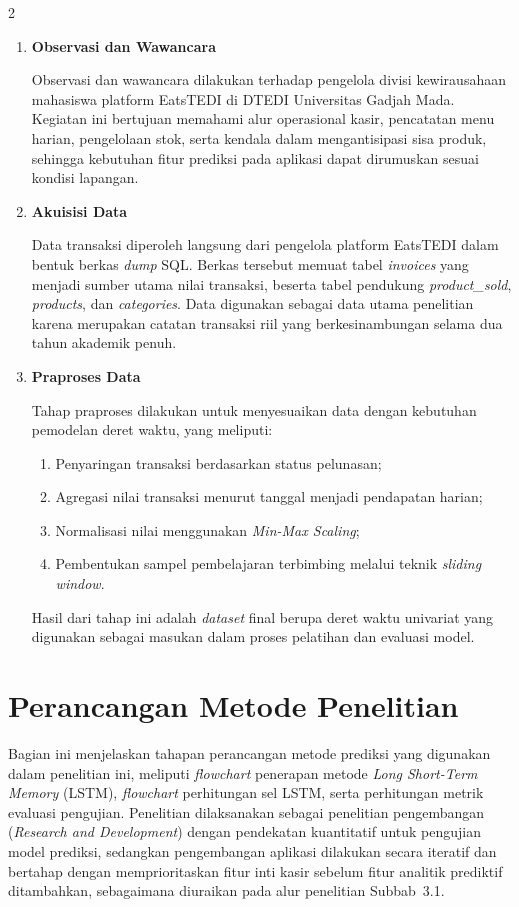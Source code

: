 \documentclass[12pt, a4paper, onecolumn, oneside]{report}
\begin{document}
\begin{spacing}{2}
\begin{enumerate}[label=\alph*.]
    \item \textbf{Observasi dan Wawancara}

    Observasi dan wawancara dilakukan terhadap pengelola divisi kewirausahaan mahasiswa platform EatsTEDI di DTEDI Universitas Gadjah Mada. Kegiatan ini bertujuan memahami alur operasional kasir, pencatatan menu harian, pengelolaan stok, serta kendala dalam mengantisipasi sisa produk, sehingga kebutuhan fitur prediksi pada aplikasi dapat dirumuskan sesuai kondisi lapangan.

    \item \textbf{Akuisisi Data}

    Data transaksi diperoleh langsung dari pengelola platform EatsTEDI dalam bentuk berkas \textit{dump} SQL. Berkas tersebut memuat tabel \textit{invoices} yang menjadi sumber utama nilai transaksi, beserta tabel pendukung \textit{product\_sold}, \textit{products}, dan \textit{categories}. Data digunakan sebagai data utama penelitian karena merupakan catatan transaksi riil yang berkesinambungan selama dua tahun akademik penuh.

    \item \textbf{Praproses Data}

    Tahap praproses dilakukan untuk menyesuaikan data dengan kebutuhan pemodelan deret waktu, yang meliputi:
    \begin{enumerate}[label=\arabic*)]
        \item Penyaringan transaksi berdasarkan status pelunasan;
        \item Agregasi nilai transaksi menurut tanggal menjadi pendapatan harian;
        \item Normalisasi nilai menggunakan \textit{Min-Max Scaling};
        \item Pembentukan sampel pembelajaran terbimbing melalui teknik \textit{sliding window}.
    \end{enumerate}
    Hasil dari tahap ini adalah \textit{dataset} final berupa deret waktu univariat yang digunakan sebagai masukan dalam proses pelatihan dan evaluasi model.
\end{enumerate}

\section{Perancangan Metode Penelitian}

Bagian ini menjelaskan tahapan perancangan metode prediksi yang digunakan dalam penelitian ini, meliputi \textit{flowchart} penerapan metode \textit{Long Short-Term Memory} (LSTM), \textit{flowchart} perhitungan sel LSTM, serta perhitungan metrik evaluasi pengujian. Penelitian dilaksanakan sebagai penelitian pengembangan (\textit{Research and Development}) dengan pendekatan kuantitatif untuk pengujian model prediksi, sedangkan pengembangan aplikasi dilakukan secara iteratif dan bertahap dengan memprioritaskan fitur inti kasir sebelum fitur analitik prediktif ditambahkan, sebagaimana diuraikan pada alur penelitian Subbab~3.1.


\end{spacing}
\end{document}
